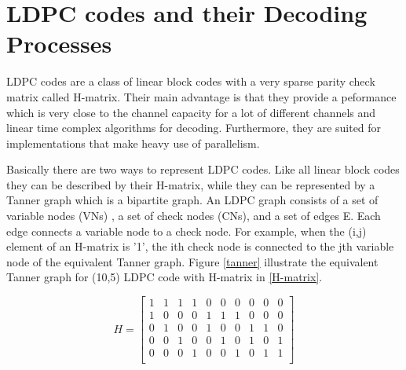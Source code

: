 \documentclass[conference]{IEEEtran}
\begin{document}
\section{LDPC codes and their Decoding Processes}\label{sec2}

LDPC codes are a class of linear block codes with a very sparse parity check matrix called H-matrix. Their main advantage is that they provide a peformance which is very close to the channel capacity for a lot of different channels and linear time complex algorithms for decoding. Furthermore, they are suited for implementations that make heavy use of parallelism.

Basically there are two ways to represent LDPC codes. Like all linear block codes they can be described by their H-matrix, while they can be represented by a Tanner graph which is a bipartite graph. An LDPC graph consists of a set of variable nodes (VNs) , a set of check nodes (CNs), and a set of edges E. Each edge connects a variable node to a check node. For example, when the (i,j) element of an H-matrix is '1', the ith check node is connected to the jth variable node of the equivalent Tanner graph. Figure \ref{tanner} illustrate the equivalent Tanner graph for (10,5) LDPC code with H-matrix in \ref{H-matrix}.

\begin{equation}\label{H-matrix}
H=
  \begin{bmatrix}
    1 & 1 & 1 & 1 & 0 &0 &0 &0 &0 &0 \\
    1 & 0 & 0 & 0 & 1 &1 &1 &0 &0 &0 \\
    0 & 1 & 0 & 0 & 1 &0 &0 &1 &1 &0 \\
    0 & 0 & 1 & 0 & 0 &1 &0 &1 &0 &1 \\
    0 & 0 & 0 & 1 & 0 &0 &1 &0 &1 &1 \\
  \end{bmatrix}
\end{equation}
\end{document}
